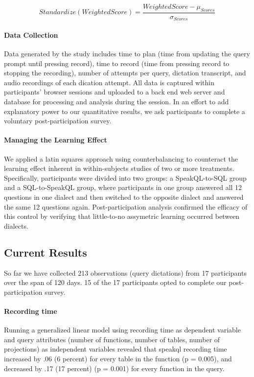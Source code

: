 \[Standardize(WeightedScore) = \frac{WeightedScore - \mu_{Scores}}{\sigma_{Scores}}\]

\paragraph{Data Collection}

Data generated by the study includes time to plan (time from updating the query prompt until pressing record), time to record (time from pressing record to stopping the recording), number of attempts per query, dictation transcript, and audio recordings of each dication attempt. All data is captured within participants' browser sessions and uploaded to a back end web server and database for processing and analysis during the session. In an effort to add explanatory power to our quantitative results, we ask participants to complete a voluntary post-participation survey. 

\paragraph{Managing the Learning Effect}

We applied a latin squares approach using counterbalancing to counteract the learning effect \cite{10.5555/2501707} inherent in within-subjects studies of two or more treatments. Specifically, participants were divided into two groups: a SpeakQL-to-SQL group and a SQL-to-SpeakQL group, where participants in one group answered all 12 questions in one dialect and then switched to the opposite dialect and answered the same 12 questions again. Post-participation analysis confirmed the efficacy of this control by verifying that little-to-no assymetric learning occurred between dialects.

\subsection{Current Results}

So far we have collected 213 observations (query dictations) from 17 participants over the span of 120 days. 15 of the 17 participants opted to complete our post-participation survey.

\paragraph{Recording time} Running a generalized linear model using recording time as dependent variable and query attributes (number of functions, number of tables, number of projections) as independent variables revealed that speakql recording time increased by .06 (6 percent) for every table in the function (p = 0.005), and decreased by .17 (17 percent) (p = 0.001) for every function in the query.

